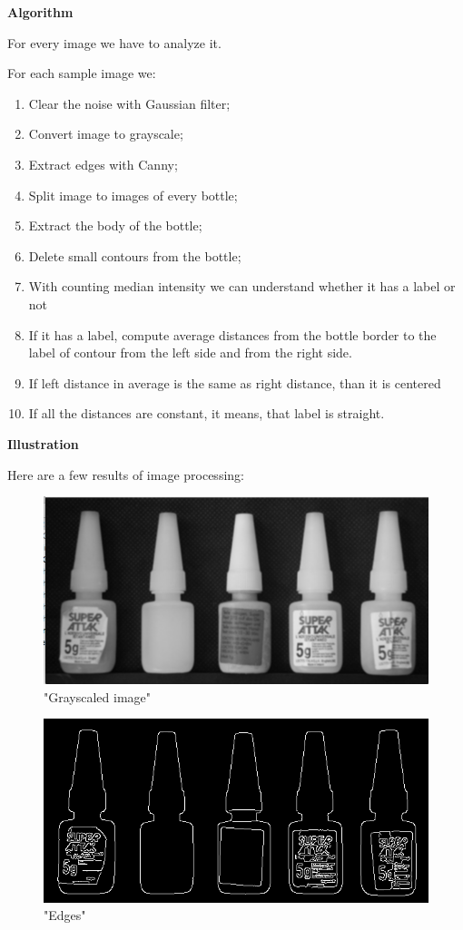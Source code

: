 \documentclass[12pt]{article}
\begin{document}
	\bigskip
	\textbf{Algorithm}
	
For every image we have to analyze it.
	
For each sample image we:\\

	\begin{enumerate}
		\item Clear the noise with Gaussian filter;
		\item Convert image to grayscale;
		\item Extract edges with Canny;
		\item Split image to images of every bottle;
		\item Extract the body of the bottle;
		\item Delete small contours from the bottle;
		\item With counting median intensity we can understand whether it has a label or not
		\item If it has a label, compute average distances from the bottle border to the label of contour from the left side and from the right side.
		\item If left distance in average is the same as right distance, than it is centered
		\item If all the distances are constant, it means, that label is straight. 
	\end{enumerate}
	
	\textbf{Illustration}
	
	Here are a few results of image processing:\\
	
	\begin{figure}[H]
		\centering
		\includegraphics[width=15cm]{1}
		\caption{"Grayscaled image"}
	\end{figure}
	
	\begin{figure}[H]
		\centering
		\includegraphics[width=15cm]{2}
		\caption{"Edges"}
	\end{figure}
	
\end{document}

